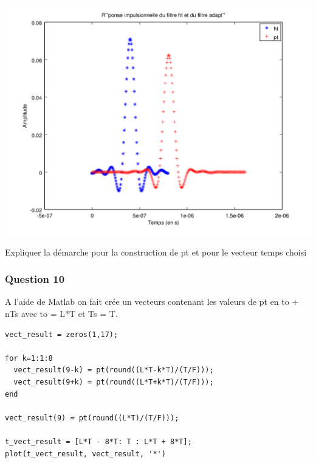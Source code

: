 \documentclass{acm_proc_article-sp}
\begin{document}
\begin{center}
\includegraphics[scale=0.45]{ht_pt_9.png}
\end{center}

Expliquer la démarche pour la construction de pt et pour le vecteur temps choisi

\subsubsection{Question 10}

A l'aide de Matlab on fait crée un vecteurs contenant les valeurs de pt en to + nTs avec to = L*T et Ts = T.

\begin{lstlisting}
vect_result = zeros(1,17);

for k=1:1:8
  vect_result(9-k) = pt(round((L*T-k*T)/(T/F)));
  vect_result(9+k) = pt(round((L*T+k*T)/(T/F)));
end

vect_result(9) = pt(round((L*T)/(T/F)));

t_vect_result = [L*T - 8*T: T : L*T + 8*T];
plot(t_vect_result, vect_result, '*')
\end{lstlisting}
\end{document}
